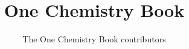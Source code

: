 \documentclass[11pt,a4paper,twoside,openany]{book}
\title{One Chemistry Book}
\author{The One Chemistry Book contributors}
\date{\bookdate}
\begin{document}
\frontmatter




\tableofcontents

\mainmatter



\appendix
\part{\omsolutionspart}


\backmatter
\printindex
\end{document}
